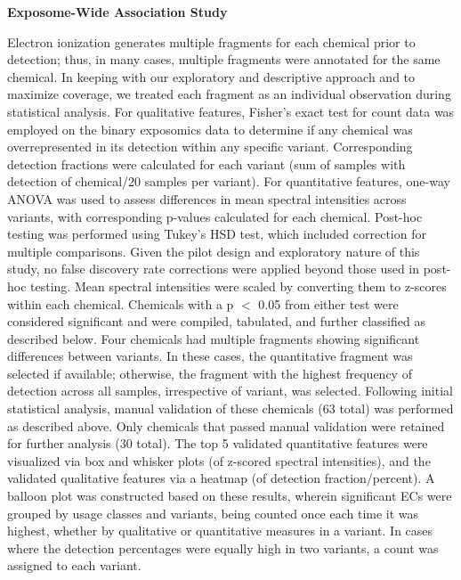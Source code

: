 \vspace{1em}

\noindent\textbf{Exposome-Wide Association Study}

Electron ionization generates multiple fragments for each chemical prior to detection; thus, in many cases, multiple fragments were annotated for the same chemical. 
In keeping with our exploratory and descriptive approach and to maximize coverage, we treated each fragment as an individual observation during statistical analysis. 
For qualitative features, Fisher's exact test for count data was employed on the binary exposomics data to determine if any chemical was overrepresented in its detection within any specific variant. 
Corresponding detection fractions were calculated for each variant (sum of samples with detection of chemical/20 samples per variant). 
For quantitative features, one-way ANOVA was used to assess differences in mean spectral intensities across variants, with corresponding p-values calculated for each chemical. 
Post-hoc testing was performed using Tukey's HSD test, which included correction for multiple comparisons. 
Given the pilot design and exploratory nature of this study, no false discovery rate corrections were applied beyond those used in post-hoc testing. 
Mean spectral intensities were scaled by converting them to z-scores within each chemical. 
Chemicals with a p $<$ 0.05 from either test were considered significant and were compiled, tabulated, and further classified as described below. 
Four chemicals had multiple fragments showing significant differences between variants. 
In these cases, the quantitative fragment was selected if available; otherwise, the fragment with the highest frequency of detection across all samples, irrespective of variant, was selected. Following initial statistical analysis, manual validation of these chemicals (63 total) was performed as described above. Only chemicals that passed manual validation were retained for further analysis (30 total).
The top 5 validated quantitative features were visualized via box and whisker plots (of z-scored spectral intensities), and the validated qualitative features via a heatmap (of detection fraction/percent). 
A balloon plot was constructed based on these results, wherein significant ECs were grouped by usage classes and variants, being counted once each time it was highest, whether by qualitative or quantitative measures in a variant. 
In cases where the detection percentages were equally high in two variants, a count was assigned to each variant.

